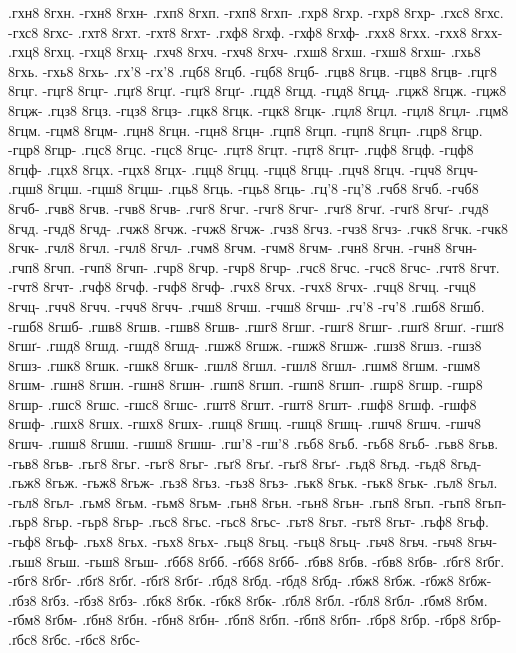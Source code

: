 {.гхн8 8гхн. -гхн8 8гхн-
.гхп8 8гхп. -гхп8 8гхп-
.гхр8 8гхр. -гхр8 8гхр-
.гхс8 8гхс. -гхс8 8гхс-
.гхт8 8гхт. -гхт8 8гхт-
.гхф8 8гхф. -гхф8 8гхф-
.гхх8 8гхх. -гхх8 8гхх-
.гхц8 8гхц. -гхц8 8гхц-
.гхч8 8гхч. -гхч8 8гхч-
.гхш8 8гхш. -гхш8 8гхш-
.гхь8 8гхь. -гхь8 8гхь-
.гх'8 -гх'8
.гцб8 8гцб. -гцб8 8гцб-
.гцв8 8гцв. -гцв8 8гцв-
.гцг8 8гцг. -гцг8 8гцг-
.гцґ8 8гцґ. -гцґ8 8гцґ-
.гцд8 8гцд. -гцд8 8гцд-
.гцж8 8гцж. -гцж8 8гцж-
.гцз8 8гцз. -гцз8 8гцз-
.гцк8 8гцк. -гцк8 8гцк-
.гцл8 8гцл. -гцл8 8гцл-
.гцм8 8гцм. -гцм8 8гцм-
.гцн8 8гцн. -гцн8 8гцн-
.гцп8 8гцп. -гцп8 8гцп-
.гцр8 8гцр. -гцр8 8гцр-
.гцс8 8гцс. -гцс8 8гцс-
.гцт8 8гцт. -гцт8 8гцт-
.гцф8 8гцф. -гцф8 8гцф-
.гцх8 8гцх. -гцх8 8гцх-
.гцц8 8гцц. -гцц8 8гцц-
.гцч8 8гцч. -гцч8 8гцч-
.гцш8 8гцш. -гцш8 8гцш-
.гць8 8гць. -гць8 8гць-
.гц'8 -гц'8
.гчб8 8гчб. -гчб8 8гчб-
.гчв8 8гчв. -гчв8 8гчв-
.гчг8 8гчг. -гчг8 8гчг-
.гчґ8 8гчґ. -гчґ8 8гчґ-
.гчд8 8гчд. -гчд8 8гчд-
.гчж8 8гчж. -гчж8 8гчж-
.гчз8 8гчз. -гчз8 8гчз-
.гчк8 8гчк. -гчк8 8гчк-
.гчл8 8гчл. -гчл8 8гчл-
.гчм8 8гчм. -гчм8 8гчм-
.гчн8 8гчн. -гчн8 8гчн-
.гчп8 8гчп. -гчп8 8гчп-
.гчр8 8гчр. -гчр8 8гчр-
.гчс8 8гчс. -гчс8 8гчс-
.гчт8 8гчт. -гчт8 8гчт-
.гчф8 8гчф. -гчф8 8гчф-
.гчх8 8гчх. -гчх8 8гчх-
.гчц8 8гчц. -гчц8 8гчц-
.гчч8 8гчч. -гчч8 8гчч-
.гчш8 8гчш. -гчш8 8гчш-
.гч'8 -гч'8
.гшб8 8гшб. -гшб8 8гшб-
.гшв8 8гшв. -гшв8 8гшв-
.гшг8 8гшг. -гшг8 8гшг-
.гшґ8 8гшґ. -гшґ8 8гшґ-
.гшд8 8гшд. -гшд8 8гшд-
.гшж8 8гшж. -гшж8 8гшж-
.гшз8 8гшз. -гшз8 8гшз-
.гшк8 8гшк. -гшк8 8гшк-
.гшл8 8гшл. -гшл8 8гшл-
.гшм8 8гшм. -гшм8 8гшм-
.гшн8 8гшн. -гшн8 8гшн-
.гшп8 8гшп. -гшп8 8гшп-
.гшр8 8гшр. -гшр8 8гшр-
.гшс8 8гшс. -гшс8 8гшс-
.гшт8 8гшт. -гшт8 8гшт-
.гшф8 8гшф. -гшф8 8гшф-
.гшх8 8гшх. -гшх8 8гшх-
.гшц8 8гшц. -гшц8 8гшц-
.гшч8 8гшч. -гшч8 8гшч-
.гшш8 8гшш. -гшш8 8гшш-
.гш'8 -гш'8
.гьб8 8гьб. -гьб8 8гьб-
.гьв8 8гьв. -гьв8 8гьв-
.гьг8 8гьг. -гьг8 8гьг-
.гьґ8 8гьґ. -гьґ8 8гьґ-
.гьд8 8гьд. -гьд8 8гьд-
.гьж8 8гьж. -гьж8 8гьж-
.гьз8 8гьз. -гьз8 8гьз-
.гьк8 8гьк. -гьк8 8гьк-
.гьл8 8гьл. -гьл8 8гьл-
.гьм8 8гьм. -гьм8 8гьм-
.гьн8 8гьн. -гьн8 8гьн-
.гьп8 8гьп. -гьп8 8гьп-
.гьр8 8гьр. -гьр8 8гьр-
.гьс8 8гьс. -гьс8 8гьс-
.гьт8 8гьт. -гьт8 8гьт-
.гьф8 8гьф. -гьф8 8гьф-
.гьх8 8гьх. -гьх8 8гьх-
.гьц8 8гьц. -гьц8 8гьц-
.гьч8 8гьч. -гьч8 8гьч-
.гьш8 8гьш. -гьш8 8гьш-
.ґбб8 8ґбб. -ґбб8 8ґбб-
.ґбв8 8ґбв. -ґбв8 8ґбв-
.ґбг8 8ґбг. -ґбг8 8ґбг-
.ґбґ8 8ґбґ. -ґбґ8 8ґбґ-
.ґбд8 8ґбд. -ґбд8 8ґбд-
.ґбж8 8ґбж. -ґбж8 8ґбж-
.ґбз8 8ґбз. -ґбз8 8ґбз-
.ґбк8 8ґбк. -ґбк8 8ґбк-
.ґбл8 8ґбл. -ґбл8 8ґбл-
.ґбм8 8ґбм. -ґбм8 8ґбм-
.ґбн8 8ґбн. -ґбн8 8ґбн-
.ґбп8 8ґбп. -ґбп8 8ґбп-
.ґбр8 8ґбр. -ґбр8 8ґбр-
.ґбс8 8ґбс. -ґбс8 8ґбс-
}

